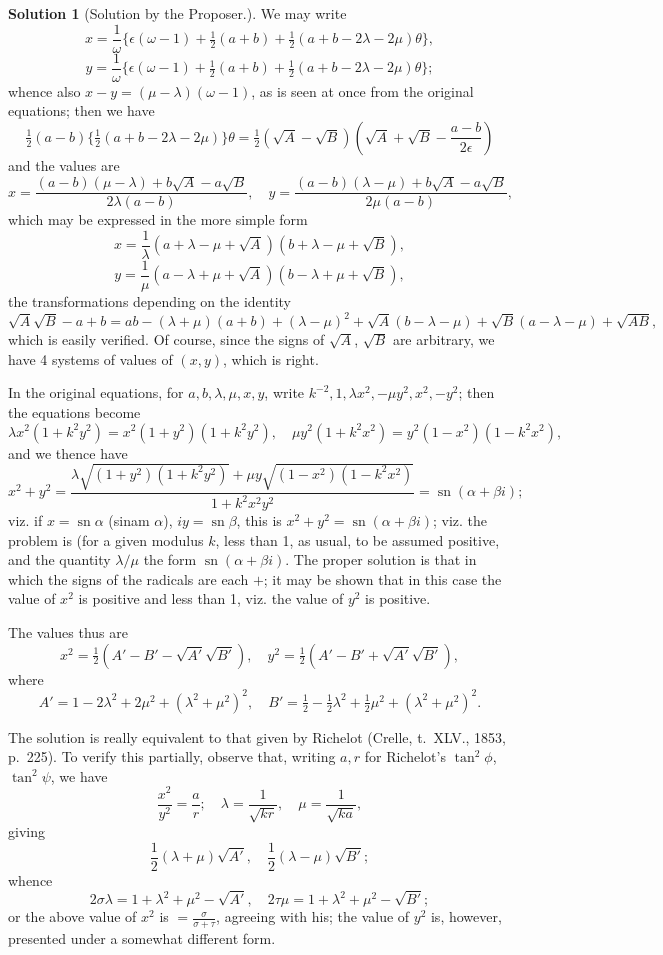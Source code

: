 \documentclass[11pt,a4paper]{article}
\theoremstyle{definition}
\newtheorem*{solution}{Solution}
\begin{document}
\begin{solution}[Solution by the Proposer.]
We may write
\[
x = \frac{1}{\omega}\{\epsilon(\omega-1) + \tfrac{1}{2}(a+b) + \tfrac{1}{2}(a+b-2\lambda-2\mu)\theta\},
\]
\[
y = \frac{1}{\omega}\{\epsilon(\omega-1) + \tfrac{1}{2}(a+b) + \tfrac{1}{2}(a+b-2\lambda-2\mu)\theta\};
\]
whence also $x-y = (\mu-\lambda)(\omega-1)$, as is seen at once from the original equations; then we have
\[
\tfrac{1}{2}(a-b)\{\tfrac{1}{2}(a+b-2\lambda-2\mu)\}\theta = \tfrac{1}{2}(\sqrt{A}-\sqrt{B})(\sqrt{A}+\sqrt{B}-\frac{a-b}{2\epsilon})
\]
and the values are
\[
x = \frac{(a-b)(\mu-\lambda) + b\sqrt{A} - a\sqrt{B}}{2\lambda(a-b)}, \quad
y = \frac{(a-b)(\lambda-\mu) + b\sqrt{A} - a\sqrt{B}}{2\mu(a-b)},
\]
which may be expressed in the more simple form
\[
x = \frac{1}{\lambda}(a+\lambda-\mu+\sqrt{A})(b+\lambda-\mu+\sqrt{B}),
\]
\[
y = \frac{1}{\mu}(a-\lambda+\mu+\sqrt{A})(b-\lambda+\mu+\sqrt{B}),
\]
the transformations depending on the identity
\[
\sqrt{A}\sqrt{B} - a + b = ab - (\lambda+\mu)(a+b) + (\lambda-\mu)^2 + \sqrt{A}(b-\lambda-\mu) + \sqrt{B}(a-\lambda-\mu) + \sqrt{AB},
\]
which is easily verified. Of course, since the signs of $\sqrt{A}$, $\sqrt{B}$ are arbitrary, we have 4 systems of values of $(x,y)$, which is right.

In the original equations, for $a,b,\lambda,\mu,x,y$, write $k^{-2}, 1, \lambda x^2, -\mu y^2, x^2, -y^2$; then the equations become
\[
\lambda x^2(1+k^2y^2) = x^2(1+y^2)(1+k^2y^2), \quad
\mu y^2(1+k^2x^2) = y^2(1-x^2)(1-k^2x^2),
\]
and we thence have
\[
x^2 + y^2 = \frac{\lambda\sqrt{(1+y^2)(1+k^2y^2)} + \mu y\sqrt{(1-x^2)(1-k^2x^2)}}{1+k^2x^2y^2} = \operatorname{sn}(\alpha+\beta i);
\]
viz. if $x = \operatorname{sn}\alpha$ (sinam $\alpha$), $iy = \operatorname{sn}\beta$, this is $x^2+y^2 = \operatorname{sn}(\alpha+\beta i)$; viz. the problem is (for a given modulus $k$, less than 1, as usual, to be assumed positive, and the quantity $\lambda/\mu$ the form $\operatorname{sn}(\alpha+\beta i)$. The proper solution is that in which the signs of the radicals are each $+$; it may be shown that in this case the value of $x^2$ is positive and less than 1, viz. the value of $y^2$ is positive.

The values thus are
\[
x^2 = \tfrac{1}{2}(A'-B'-\sqrt{A'}\sqrt{B'}), \quad
y^2 = \tfrac{1}{2}(A'-B'+\sqrt{A'}\sqrt{B'}),
\]
where
\[
A' = 1 - 2\lambda^2 + 2\mu^2 + (\lambda^2+\mu^2)^2, \quad
B' = \tfrac{1}{2} - \tfrac{1}{2}\lambda^2 + \tfrac{1}{2}\mu^2 + (\lambda^2+\mu^2)^2.
\]

The solution is really equivalent to that given by Richelot (Crelle, t.~XLV., 1853, p.~225). To verify this partially, observe that, writing $a,r$ for Richelot's $\tan^2\phi$, $\tan^2\psi$, we have
\[
\frac{x^2}{y^2} = \frac{a}{r}; \quad
\lambda = \frac{1}{\sqrt{kr}}, \quad \mu = \frac{1}{\sqrt{ka}},
\]
giving
\[
\frac{1}{2}(\lambda+\mu)\sqrt{A'}, \quad
\frac{1}{2}(\lambda-\mu)\sqrt{B'};
\]
whence
\[
2\sigma\lambda = 1+\lambda^2+\mu^2-\sqrt{A'}, \quad
2\tau\mu = 1+\lambda^2+\mu^2-\sqrt{B'};
\]
or the above value of $x^2$ is $= \frac{\sigma}{\sigma+\tau}$, agreeing with his; the value of $y^2$ is, however, presented under a somewhat different form.


\end{solution}
\end{document}
